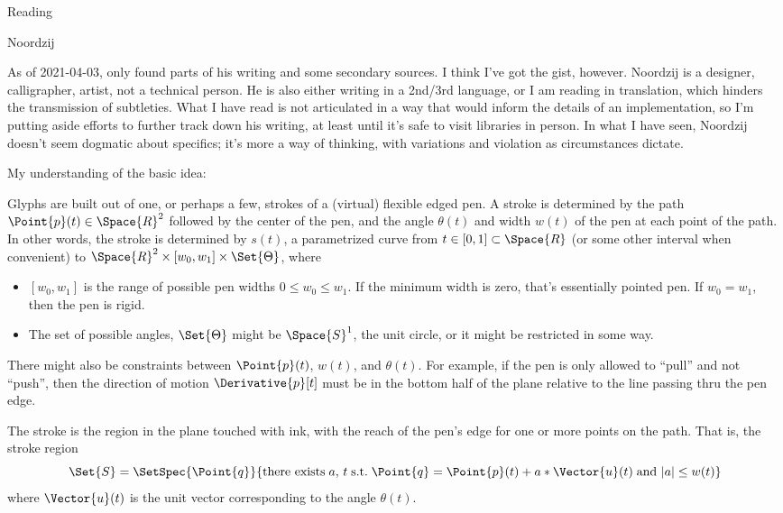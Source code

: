 \documentclass[11pt]{PalisadesLakesBook}
\begin{document}
\begin{plSection}{Reading}
\begin{plSection}{Noordzij}

As of 2021-04-03, only found parts of his writing
and some secondary sources.
I think I've got the gist, however.
Noordzij is a designer, calligrapher, artist, not a technical
person. 
He is also either writing in a 2nd/3rd language,
or I am reading in translation,
which hinders the transmission of subtleties.
What I have read is not articulated in a way that would inform 
the details of an implementation, so I'm putting aside efforts
to further track down his writing, at least until it's 
safe to visit libraries in person.
In what I have seen, Noordzij doesn't seem dogmatic 
about specifics;
it's more a way of thinking, with variations and violation
as circumstances dictate.

My understanding of the basic idea:

Glyphs are built out of one, or perhaps a few, strokes 
of a (virtual) flexible edged pen.
A stroke is determined by the path $\Point{p}(t) \in \Space{R}^2$
followed by the center of the pen,
and the angle $\theta(t)$ and width $w(t)$
of the pen at each point of the path.
In other words, the stroke is determined 
by $s(t)$, a parametrized curve 
from $t \in \left[ 0, 1 \right] \subset \Space{R}$
(or some other interval when convenient)
to $\Space{R}^2 \times 
\left[ w_{0}, w_{1} \right] 
\times \Set{\Theta}$,
where 
\begin{itemize}

  \item $\left[ w_{0}, w_{1} \right]$ is 
the range of possible pen widths $0 \leq w_{0} \leq w_{1}$.
If the minimum width is zero, that's essentially pointed pen.
If $w_{0}=w_{1}$, then the pen is rigid.

  \item The set of possible angles, $\Set{\Theta}$
  might be $\Space{S}^{1}$, the unit circle,
  or it might be restricted in some way. 
\end{itemize}
There might also be constraints between 
$\Point{p}(t)$, $w(t)$, and $\theta(t)$.
For example, if the pen is only allowed to ``pull''
and not ``push'', then the direction of motion 
$\Derivative{p}[t]$ must be in the bottom half of the 
plane relative to the line passing thru the pen edge.

The stroke is the region in the plane touched with ink,
with the reach of the pen's edge for one or more points 
on the path.
That is, the stroke region 
\begin{equation}
\Set{S} = 
\SetSpec{\Point{q}}{\text{there exists} \; a,\,t \; \text{s.t.} \; 
\Point{q} = \Point{p}(t) + a*\Vector{u}(t) \;\text{and}\ 
|a| \leq w(t)
}
\end{equation}
where $\Vector{u}(t)$ is the unit vector corresponding to the
angle $\theta(t)$.


\end{plSection}
\end{plSection}
\end{document}
